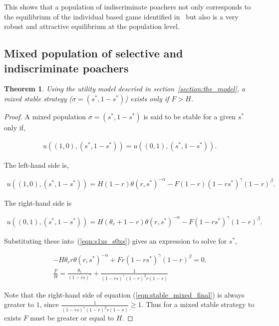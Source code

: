 \documentclass[10pt]{article}
\newtheorem{theorem}{Theorem}
\begin{document}
This shows that a population of indiscriminate poachers 
not only corresponds to the equilibrium of the individual based 
game identified in~\cite{Lee} but also is a very robust and attractive 
equilibrium at the population level.

\subsection{Mixed population of selective and indiscriminate poachers}

\begin{theorem} 
Using the utility model descried in section~\ref{section:the_model}, a mixed
stable strategy (\(\sigma=(s^*, 1 - s^*)\)) exists only if \(F > H\).  
\end{theorem}

\begin{proof}
    A mixed population \(\sigma = (s^*, 1 - s^*)\) is said to be stable for a
    given \(s^*\) only if,

    \begin{eqnarray}
    \label{eqn:s1xs_s0xs}
    u((1, 0),(s^*, 1 - s^*)) = u((0, 1),(s^*, 1 - s^*)).
    \end{eqnarray}

    The left-hand side is,

    \begin{eqnarray} \nonumber
    u((1, 0),(s^*, 1 - s^*)) =
    H(1 - r) \theta(r, s^*)^{-\alpha} - F (1 - r)(1 - rs^*)^{\gamma}(1 - r)^{\beta} .
    \end{eqnarray}

    The right-hand side is

    \begin{eqnarray} \nonumber
    u((0, 1),(s^*, 1 - s^*)) =
    H(\theta_r + 1 - r)\theta(r, s^*)^{-\alpha} - F(1 - rs^*)^{\gamma}(1 - r)^{\beta} .
    \end{eqnarray}

    Substituting these into~(\ref{eqn:s1xs_s0xs}) gives an expression to solve 
    for \(s^*\),

    \begin{eqnarray}
    \label{eqn:stablemixed}
    - H \theta_r r \theta(r, s^*)^{-\alpha}  + F r (1 - rs^*)^{\gamma}(1 - r)^{\beta} = 0.
    \\
    \label{eqn:stable_mixed_final}
    \frac{F}{H} = \frac{\theta_r}{(1 - rs) ^ {\gamma}} + \frac{1}{(1 - rs) ^ \gamma
    (1- r) ^ {\beta} r (1- s)}
    \end{eqnarray}

    Note that the right-hand side of equation (\ref{eqn:stable_mixed_final})
    is always greater to \(1\), since \(\frac{1}{(1 - rs) ^ \gamma(1- r) ^ {\beta} 
    r (1- s)} \geq 1\). Thus for a mixed stable strategy to exists \(F\) must be
    greater or equal to \(H\).
\end{proof}
\end{document}
